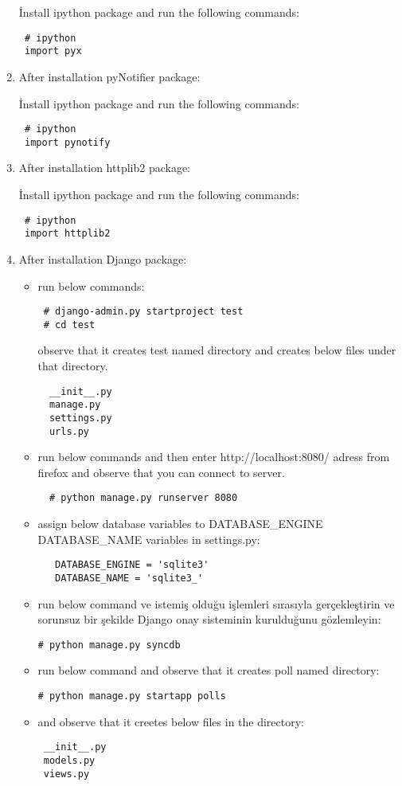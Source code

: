 \documentclass[a4paper,10pt]{article}
\begin{document}
\begin{enumerate}
İnstall ipython package and run the following commands:
\begin{verbatim}
 # ipython
 import pyx
\end{verbatim}

\item After installation pyNotifier package:

İnstall ipython package and run the following commands:
\begin{verbatim}
 # ipython
 import pynotify
\end{verbatim}


\item After installation httplib2 package:

İnstall ipython package and run the following commands:
\begin{verbatim}
 # ipython
 import httplib2
\end{verbatim}

 \item After installation Django package:
\begin{itemize}
 \item run below commands:
 \begin{verbatim}
 # django-admin.py startproject test
 # cd test
 \end{verbatim}
 observe that it creates test named directory and creates below files under that directory.
  \begin{verbatim}
  __init__.py
  manage.py
  settings.py
  urls.py 
  \end{verbatim}
 \item run below commands and then enter http://localhost:8080/ adress from firefox and observe that you can connect to server.
  \begin{verbatim}
  # python manage.py runserver 8080
  \end{verbatim}
 \item  assign below database variables to DATABASE\_ENGINE DATABASE\_NAME variables in settings.py:
  \begin{verbatim}
   DATABASE_ENGINE = 'sqlite3'
   DATABASE_NAME = 'sqlite3_'   
  \end{verbatim}
\item run below command ve istemiş olduğu işlemleri sırasıyla gerçekleştirin ve sorunsuz bir şekilde Django onay sisteminin kurulduğunu gözlemleyin:
\begin{verbatim}
# python manage.py syncdb 
\end{verbatim}
\item run below command and observe that it creates poll named directory:
\begin{verbatim}
# python manage.py startapp polls 
\end{verbatim}
\item and observe that it creetes below files in the directory:
\begin{verbatim}
 __init__.py
 models.py
 views.py
\end{verbatim}


\end{itemize}
\end{enumerate}
\end{document}

